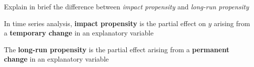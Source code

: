 
\question[2] Explain in brief the difference between \textit{impact propensity} and \textit{long-run propensity}

\begin{solution}[\mcq]
  In time series analysis, \textbf{impact propensity} is the partial effect on $y$ arising 
  from a \textbf{temporary change} in an explanatory variable
  
  The \textbf{long-run propensity} is the partial effect arising from a \textbf{permanent change} in an explanatory variable
\end{solution}

